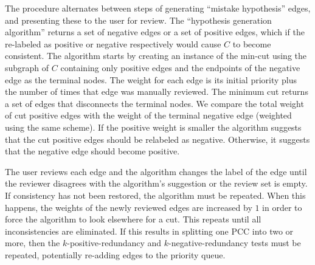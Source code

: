 The procedure alternates between steps of generating ``mistake hypothesis''
  edges, and presenting these to the user for review.
The ``hypothesis generation algorithm'' returns a set of negative edges or a
  set of positive edges, which if the re-labeled as positive or negative
  respectively would cause $C$ to become consistent.
The algorithm starts by creating an instance of the min-cut using the subgraph
  of $C$ containing only positive edges and the endpoints of the negative edge
  as the terminal nodes.
The weight for each edge is its initial priority plus the number of times that
  edge was manually reviewed.
The minimum cut returns a set of edges that disconnects the terminal nodes.
We compare the total weight of cut positive edges with the weight of the
  terminal negative edge (weighted using the same scheme).
If the positive weight is smaller the algorithm suggests that the cut positive
  edges should be relabeled as negative.
Otherwise, it suggests that the negative edge should become positive.

The user reviews each edge and the algorithm changes the label of the edge
  until the reviewer disagrees with the algorithm's suggestion or the review set
  is empty.
If consistency has not been restored, the algorithm must be repeated.
When this happens, the weights of the newly reviewed edges are increased by
  $1$ in order to force the algorithm to look elsewhere for a cut.
This repeats until all inconsistencies are eliminated.
If this results in splitting one PCC into two or more, then the
  $k$-positive-redundancy and $k$-negative-redundancy tests must be repeated,
  potentially re-adding edges to the priority queue.



